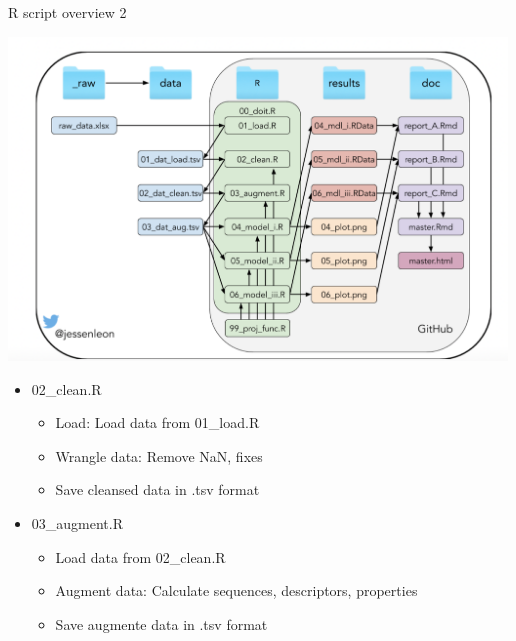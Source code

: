 \documentclass[ignorenonframetext,]{beamer}
\providecommand{\tightlist}{%
  \setlength{\itemsep}{0pt}\setlength{\parskip}{0pt}}
\begin{document}
\begin{frame}{R script overview 2}
\protect\hypertarget{r-script-overview-2}{}

\includegraphics[width=5.20833in,height=\textheight]{project_organisation.png}

\begin{itemize}
\tightlist
\item
  02\_clean.R

  \begin{itemize}
  \tightlist
  \item
    Load: Load data from 01\_load.R
  \item
    Wrangle data: Remove NaN, fixes
  \item
    Save cleansed data in .tsv format
  \end{itemize}
\item
  03\_augment.R

  \begin{itemize}
  \tightlist
  \item
    Load data from 02\_clean.R
  \item
    Augment data: Calculate sequences, descriptors, properties
  \item
    Save augmente data in .tsv format
  \end{itemize}
\end{itemize}

\end{frame}
\end{document}
